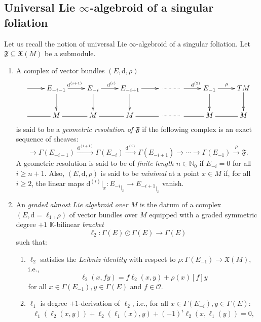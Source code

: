 \documentclass[10pt]{article}
\theoremstyle{plain}
\theoremstyle{definition}
\theoremstyle{remark}
\newcommand{\dd}{\mathrm{d}}
\begin{document}
 \subsection{Universal Lie $\infty$-algebroid of a singular foliation}\label{sec:universal}Let us recall the notion of universal  Lie $\infty$-algebroid of a singular foliation. Let $\mathfrak{F}\subseteq\mathfrak{X}(M)$ be a submodule.
\begin{enumerate}
\item \label{def: geom.resol} A complex of vector bundles $(E, \dd, \rho)$
    $$   \xymatrix{  \ar[r] & E_{-i-1} \ar[r]^{{\dd^{(i+1)}}} \ar[d] & 
     E_{ -i} \ar[r]^{{\dd^{(i)}}}
     \ar[d] & E_{-i+1} \ar[r] \ar[d] & \ar@{..}[r] & \ar[r]^{{\dd^{(2)}}}& E_{-1} \ar[r]^{\rho} \ar[d]& TM \ar[d] \\ 
      \ar@{=}[r] & \ar@{=}[r] M  &  \ar@{=}[r] M 
      &  \ar@{=}[r] M  &\ar@{..}[r] & \ar@{=}[r]   &  \ar@{=}[r] M  & M}
    $$
    is said 
 to be a \emph{geometric resolution of  $\mathfrak F$} if the following complex is an exact sequence of sheaves:
      \begin{equation}
           \label{eq:exact}{\longrightarrow} \Gamma({E_{ -i-1}})
     \stackrel{\dd^{(i+1)}}{\longrightarrow} \Gamma({E_{-i}})
     \stackrel{\dd^{(i)}}{\longrightarrow}{\Gamma(E_{-i+1})}{\longrightarrow}\cdots  {\longrightarrow} \Gamma(E_{-1})  
     \stackrel{\rho}{\longrightarrow} \mathfrak F.
      \end{equation} A geometric resolution is said to be of \emph{finite length $n\in \mathbb N_0$} if $E_{-i}=0$ for all $i\geq n+1$. Also,  $(E, \dd, \rho)$ is said to be \emph{minimal} at a point $x\in M$ if, for all $i\geq 2$, the linear maps $\dd^{(i)}{|_x}\colon {E_{-i}}_{|_x}\longrightarrow  {E _{-i+1}}_{|_x}$ vanish. 
      
\item\label{almost}  An \emph{graded almost  Lie algebroid over $M$} is the datum of a complex $(E,\dd=\ell_1,\rho)$ of vector bundles over $M$ equipped with a graded symmetric degree $+1$ $\mathbb{K}$-bilinear \emph{bracket} $$ \ell_2 \colon \Gamma(E)\odot\Gamma(E)\rightarrow\Gamma(E) $$ such that:
\begin{enumerate}
\item  $\ell_2$ satisfies the \emph{Leibniz identity} with respect to  $\rho \colon \Gamma( E_{-1}) \longrightarrow \mathfrak{X}(M) $, i.e.,
\begin{equation*}
    \ell_2(x, fy) = f\ell_2(x,y)+\rho(x)[f]y
\end{equation*}
for all $x\in \Gamma(E_{-1}),y\in \Gamma(E)$ and $f\in\mathcal{O}$.
\item $\ell_1$ is degree $+1 $-derivation of $\ell_2 $, i.e., for all  $x \in \Gamma( E_{-i}), y \in \Gamma(E)$:
$$ \ell_1 (\ell_2(x,y)) +  \ell_2( \ell_1( x),y) + (-1)^{i}  \ell_2( x  , \ell_1( y)) = 0,$$ 


\end{enumerate}
\end{enumerate}
\end{document}
